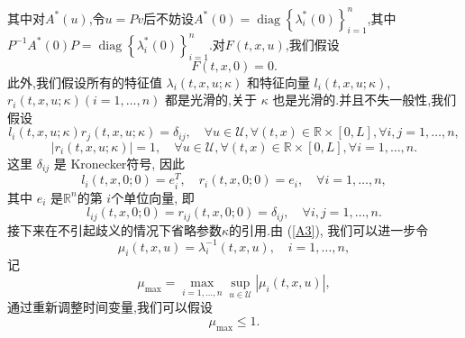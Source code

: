 \documentclass[notitlepage,cs4size,punct,oneside]{ctexrep}
\numberwithin{equation}{chapter}
\theoremstyle{mystyle}
\begin{document}
其中对$A^{*}(u)$,令$u=Pv$后不妨设$A^{*}(0)=\operatorname{diag}\left\{\lambda_{i}^{*}(0)\right\}_{i=1}^{n} $,其中$P^{-1}A^{*}(0)P=\operatorname{diag}\left\{\lambda_{i}^{*}(0)\right\}_{i=1}^{n} $.对$F(t,x,u)$,我们假设
\begin{equation}\label{A7}
    F(t,x,0)=0.
\end{equation}
此外,我们假设所有的特征值 $\lambda_{i}(t, x, u; \kappa)$ 和特征向量 $l_{i}(t, x, u; \kappa)$, $r_{i}(t, x, u; \kappa) (i = 1, \ldots, n)$ 都是光滑的,关于 $\kappa$ 也是光滑的.并且不失一般性,我们假设
\begin{equation}\label{A8}
    l_{i}(t,x,u;\kappa )r_{j}(t,x,u;\kappa ) = \delta_{ij},  \quad \forall u \in \mathcal{U}, \forall (t,x) \in \mathbb{R} \times [0,L], \forall i,j=1,\ldots,n,
\end{equation}
\begin{equation}\label{A9}
    | {r_{i}(t,x,u;\kappa )}|  = 1,  \quad \forall u \in \mathcal{U}, \forall (t,x) \in \mathbb{R} \times [0,L], \forall i=1,\ldots,n.
\end{equation}
这里 $\delta_{i j}$ 是 Kronecker符号, 因此
\begin{equation}\label{A10}
    l_{i}(t,x,0;0)=e_{i}^{T}, \quad r_{i}(t,x,0;0)=e_{i}, \quad \forall i=1, \ldots, n,
\end{equation}
其中 $e_{i}$ 是$\mathbb{R}^{n}$的第 $i$个单位向量, 即
\begin{equation}\label{A11}
    l_{i j}(t,x,0;0)=r_{i j}(t,x,0;0)=\delta_{i j}, \quad \forall i, j=1, \ldots, n .
\end{equation}
接下来在不引起歧义的情况下省略参数$\kappa $的引用.由 (\ref{A3}), 我们可以进一步令
\begin{equation}\label{A12}
    \mu_{i}(t,x,u)=\lambda_{i}^{-1}(t,x,u), \quad i=1, \ldots, n,
\end{equation}
记
\begin{equation}\label{A13}
    \mu_{\max }=\max _{i=1, \ldots, n} \sup _{u \in \mathcal{U}}\left|\mu_{i}(t,x,u)\right|,
\end{equation}
通过重新调整时间变量,我们可以假设
\begin{equation}\label{A14}
    \mu_{\max } \leq 1.
\end{equation}
\end{document}
